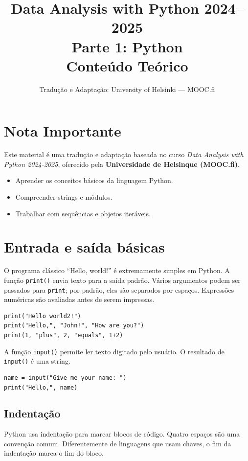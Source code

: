 \documentclass[11pt,a4paper]{article}
\title{\textbf{Data Analysis with Python 2024--2025}\\Parte 1: Python\\\large Conteúdo Teórico}
\author{Tradução e Adaptação: University of Helsinki --- MOOC.fi}
\date{}
\begin{document}
\maketitle

\section*{Nota Importante}
Este material é uma tradução e adaptação baseada no curso \textit{Data Analysis with Python 2024-2025}, oferecido pela \textbf{Universidade de Helsinque (MOOC.fi)}.

\begin{objetivos}
\begin{itemize}
    \item Aprender os conceitos básicos da linguagem Python.
    \item Compreender strings e módulos.
    \item Trabalhar com sequências e objetos iteráveis.
\end{itemize}
\end{objetivos}

\tableofcontents
\newpage

\section{Entrada e saída básicas}
O programa clássico ``Hello, world!'' é extremamente simples em Python. A função \texttt{print()} envia texto para a saída padrão. Vários argumentos podem ser passados para \texttt{print}; por padrão, eles são separados por espaços. Expressões numéricas são avaliadas antes de serem impressas.

\begin{lstlisting}
print("Hello world2!")
print("Hello,", "John!", "How are you?")
print(1, "plus", 2, "equals", 1+2)
\end{lstlisting}

A função \texttt{input()} permite ler texto digitado pelo usuário. O resultado de \texttt{input()} é uma string.
\begin{lstlisting}
name = input("Give me your name: ")
print("Hello,", name)
\end{lstlisting}

\subsection{Indentação}
Python usa indentação para marcar blocos de código. Quatro espaços são uma convenção comum. Diferentemente de linguagens que usam chaves, o fim da indentação marca o fim do bloco.
\end{document}
